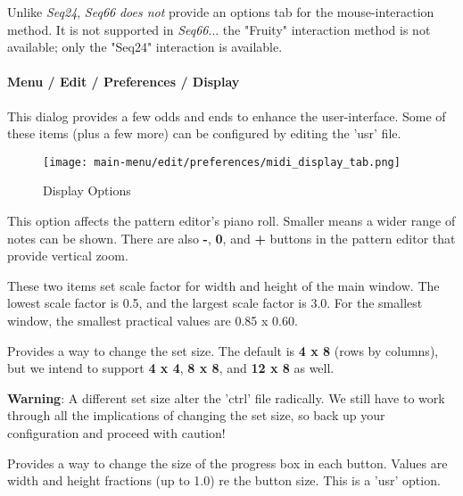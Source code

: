    Unlike \textsl{Seq24}, \textsl{Seq66}
   \textsl{does not} provide an options tab for
   the mouse-interaction method.
   It is not supported in \textsl{Seq66}...
   the "Fruity" interaction method is not available;
   only the "Seq24" interaction is available.
 
\paragraph{Menu / Edit / Preferences / Display}
\label{paragraph:menu_edit_preferences_display}

   This dialog provides a few odds and ends to enhance the user-interface.
   Some of these items (plus a few more) can be configured by editing the 'usr'
   file.

\begin{figure}[H]
   \centering 
   \texttt{[image: main-menu/edit/preferences/midi\_display\_tab.png]}
   \caption{Display Options}
   \label{fig:midi_display_tab}
\end{figure}

   \setcounter{ItemCounter}{0}      %

   This option affects the pattern editor's piano roll.  Smaller means a wider
   range of notes can be shown.  There are also
   \textbf{-},
   \textbf{0}, and
   \textbf{+} buttons in the pattern editor that provide
   vertical zoom.

   These two items set scale factor for width and height of the main window.
   The lowest scale factor is 0.5, and the largest scale factor is 3.0.
   For the smallest window, the smallest practical values are 0.85 x 0.60.

   Provides a way to change the set size.  The default is
   \textbf{4 x 8}
   (rows by columns), but we intend to support
   \textbf{4 x 4},
   \textbf{8 x 8}, and
   \textbf{12 x 8}
   as well.

   \textbf{Warning}:
   A different set size alter the 'ctrl' file radically.
   We still have to work through all the implications of changing the set size,
   so back up your configuration and proceed with caution!

   Provides a way to change the size of the progress box in each button.
   Values are width and height fractions (up to 1.0) re the button size.
   This is a 'usr' option.


